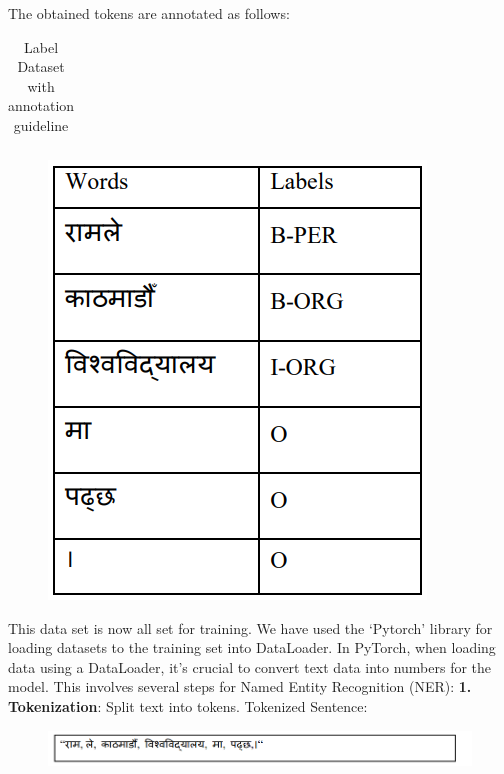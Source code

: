The obtained tokens are annotated as follows:

  \begin{table}[H]
  
\caption{ Label Dataset with annotation guideline}
\label{tab:   Label Dataset with annotation guideline}
    \centering
    
    \begin{tabular}{|c|c|c|}
    \end{tabular}
    
    
\end{table}
 
\begin{figure}[H]
\centering
\includegraphics [scale=1]{img/workingPrinciple/ramle lebel.png}

\end{figure}
 
This data set is now all set for training. We have used the ‘Pytorch’ library for loading datasets to the training set into DataLoader. In PyTorch, when loading data using a DataLoader, it's crucial to convert text data into numbers for the model. This involves several steps for Named Entity Recognition (NER):
\newpage
\textbf{1.	Tokenization}: Split text into tokens.
           Tokenized Sentence:
           \begin{figure}[H]
\centering
\includegraphics [scale=1]{img/workingPrinciple/ramle ku.png}

\end{figure}
 
